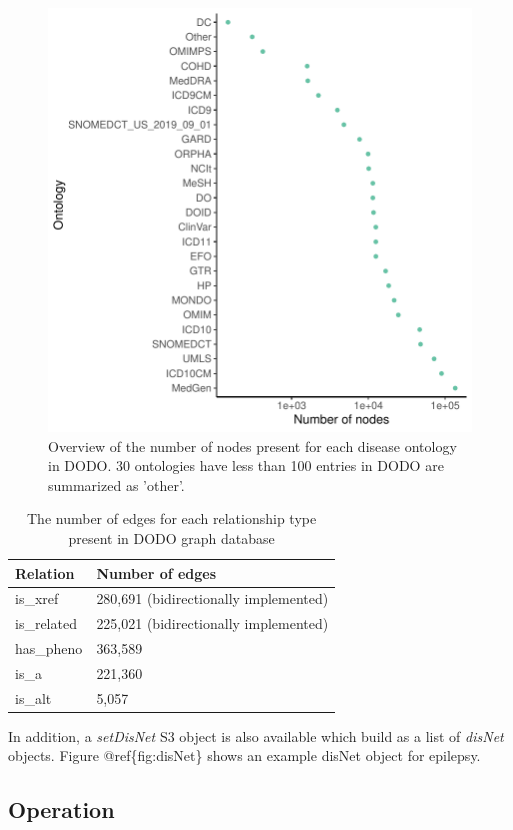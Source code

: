 \documentclass[9pt,a4paper,]{extarticle}
\begin{document}
\begin{figure}

{\centering \includegraphics[width=0.5\linewidth,height=0.3\textheight]{DODO-F1000-publication_files/figure-latex/listDB-1} 

}

\caption{Overview of the number of nodes present for each disease ontology in DODO. 30 ontologies have less than 100 entries in DODO are summarized as 'other'.}\label{fig:listDB}
\end{figure}

\begin{table}

\caption{\label{tab:nodeNb}The number of edges for each relationship type present in DODO graph database}
\centering
\begin{tabular}[t]{ll}
\toprule
Relation & Number of edges\\
\midrule
is\_xref & 280,691 (bidirectionally implemented)\\
is\_related & 225,021 (bidirectionally implemented)\\
has\_pheno & 363,589\\
is\_a & 221,360\\
is\_alt & 5,057\\
\bottomrule
\end{tabular}
\end{table}

In addition, a \emph{setDisNet} S3 object is also available which build as a list of \emph{disNet} objects. Figure @ref\{fig:disNet\} shows an example disNet object for epilepsy.

\hypertarget{operation}{%
\subsection{Operation}\label{operation}}
\end{document}
